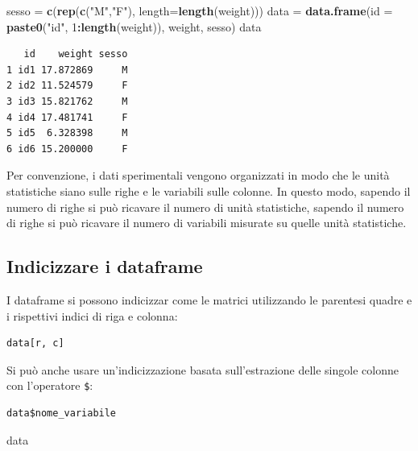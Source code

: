 \documentclass[
  a4paper,
  DIV=11,
  numbers=noendperiod]{scrreprt}
\newenvironment{Shaded}{\begin{snugshade}}{\end{snugshade}}
\newcommand{\AttributeTok}[1]{\textcolor[rgb]{0.13,0.29,0.53}{#1}}
\newcommand{\DecValTok}[1]{\textcolor[rgb]{0.00,0.00,0.81}{#1}}
\newcommand{\FunctionTok}[1]{\textcolor[rgb]{0.13,0.29,0.53}{\textbf{#1}}}
\newcommand{\NormalTok}[1]{#1}
\newcommand{\OtherTok}[1]{\textcolor[rgb]{0.56,0.35,0.01}{#1}}
\newcommand{\SpecialCharTok}[1]{\textcolor[rgb]{0.81,0.36,0.00}{\textbf{#1}}}
\newcommand{\StringTok}[1]{\textcolor[rgb]{0.31,0.60,0.02}{#1}}
\begin{document}
\begin{Shaded}
\begin{Highlighting}[]
\NormalTok{sesso }\OtherTok{=} \FunctionTok{c}\NormalTok{(}\FunctionTok{rep}\NormalTok{(}\FunctionTok{c}\NormalTok{(}\StringTok{"M"}\NormalTok{,}\StringTok{"F"}\NormalTok{), }\AttributeTok{length=}\FunctionTok{length}\NormalTok{(weight)))}
\NormalTok{data }\OtherTok{=} \FunctionTok{data.frame}\NormalTok{(}\AttributeTok{id =} \FunctionTok{paste0}\NormalTok{(}\StringTok{"id"}\NormalTok{, }\DecValTok{1}\SpecialCharTok{:}\FunctionTok{length}\NormalTok{(weight)), }
\NormalTok{                  weight, sesso)}
\NormalTok{data}
\end{Highlighting}
\end{Shaded}

\begin{verbatim}
   id    weight sesso
1 id1 17.872869     M
2 id2 11.524579     F
3 id3 15.821762     M
4 id4 17.481741     F
5 id5  6.328398     M
6 id6 15.200000     F
\end{verbatim}

Per convenzione, i dati sperimentali vengono organizzati in modo che le
unità statistiche siano sulle righe e le variabili sulle colonne. In
questo modo, sapendo il numero di righe si può ricavare il numero di
unità statistiche, sapendo il numero di righe si può ricavare il numero
di variabili misurate su quelle unità statistiche.

\subsection{Indicizzare i dataframe}\label{sec-indDataframe}

I dataframe si possono indicizzar come le matrici utilizzando le
parentesi quadre e i rispettivi indici di riga e colonna:

\begin{verbatim}
data[r, c]
\end{verbatim}

Si può anche usare un'indicizzazione basata sull'estrazione delle
singole colonne con l'operatore \texttt{\$}:

\begin{verbatim}
data$nome_variabile
\end{verbatim}

\begin{Shaded}
\begin{Highlighting}[]
\NormalTok{data}
\end{Highlighting}
\end{Shaded}
\end{document}
